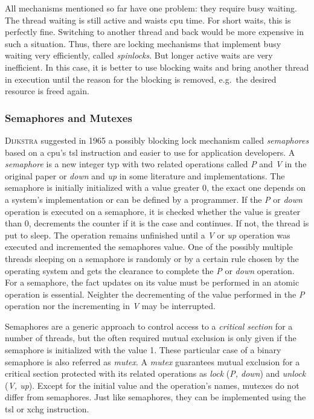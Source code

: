 All mechanisms mentioned so far have one problem: they require busy waiting.
The thread waiting is still active and waists \ac{cpu} time.
For short waits, this is perfectly fine.  
Switching to another thread and back would be more expensive in such a situation\cite{glatz2015betriebssysteme}. 
Thus, there are locking mechanisms that implement busy waiting very efficiently, called \textit{spinlocks}\cite{tanenbaum-modern-operating-systems}.
But longer active waits are very inefficient.
In this case, it is better to use blocking waits and bring another thread in execution until the reason for the blocking is removed, e.g.\ the desired resource is freed again.

\subsubsection*{Semaphores and Mutexes}
\textsc{Dijkstra} suggested in 1965 a possibly blocking lock mechanism called \textit{semaphores} based on a \ac{cpu}'s \ac{tsl} instruction and easier to use for application developers.
A \textit{semaphore} is a new integer typ with two related operations called \textit{P} and \textit{V} in the original paper or \textit{down} and \textit{up} in some literature and implementations\cite{glatz2015betriebssysteme}.
The semaphore is initially initialized with a value greater 0, the exact one depends on a system's implementation or can be defined by a programmer.
If the \textit{P} or \textit{down} operation is executed on a semaphore, it is checked whether the value is greater than 0, decrements the counter if it is the case and continues. 
If not, the thread is put to sleep.
The operation remains unfinished until a \textit{V} or \textit{up} operation was executed and incremented the semaphores value.
One of the possibly multiple threads sleeping on a semaphore is randomly or by a certain rule chosen by the operating system and gets the clearance to complete the \textit{P} or \textit{down} operation\cite{tanenbaum-modern-operating-systems}.
For a semaphore, the fact updates on its value must be performed in an atomic operation is essential\cite{silberschatz2009operating}.
Neighter the decrementing of the value performed in the \textit{P} operation nor the incrementing in \textit{V} may be interrupted.

Semaphores are a generic approach to control access to a \textit{critical section} for a number of threads, but the often required mutual exclusion is only given if the semaphore is initialized with the value 1.
These particular case of a binary semaphore is also referred as \textit{mutex}.
A \textit{mutex} guarantees mutual exclusion for a critical section protected with its related operations as \textit{lock} (\textit{P, down}) and \textit{unlock} (\textit{V, up})\cite{tanenbaum-modern-operating-systems}.
Except for the initial value and the operation's names, mutexes do not differ from semaphores.
Just like semaphores, they can be implemented using the \ac{tsl} or \ac{xchg} instruction.

